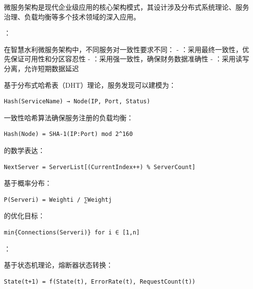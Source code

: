 
微服务架构是现代企业级应用的核心架构模式，其设计涉及分布式系统理论、服务治理、负载均衡等多个技术领域的深入应用。

：


在智慧水利微服务架构中，不同服务对一致性要求不同： - ：采用最终一致性，优先保证可用性和分区容忍性 - ：采用强一致性，确保财务数据准确性 - ：采用读写分离，允许短期数据延迟


基于分布式哈希表（DHT）理论，服务发现可以建模为：

\begin{lstlisting}
Hash(ServiceName) → Node(IP, Port, Status)
\end{lstlisting}

一致性哈希算法确保服务注册的负载均衡：

\begin{lstlisting}
Hash(Node) = SHA-1(IP:Port) mod 2^160
\end{lstlisting}


的数学表达：

\begin{lstlisting}
NextServer = ServerList[(CurrentIndex++) % ServerCount]
\end{lstlisting}

基于概率分布：

\begin{lstlisting}
P(Serveri) = Weighti / ∑Weightj
\end{lstlisting}

的优化目标：

\begin{lstlisting}
min{Connections(Serveri)} for i ∈ [1,n]
\end{lstlisting}

：


基于状态机理论，熔断器状态转换：

\begin{lstlisting}
State(t+1) = f(State(t), ErrorRate(t), RequestCount(t))
\end{lstlisting}

